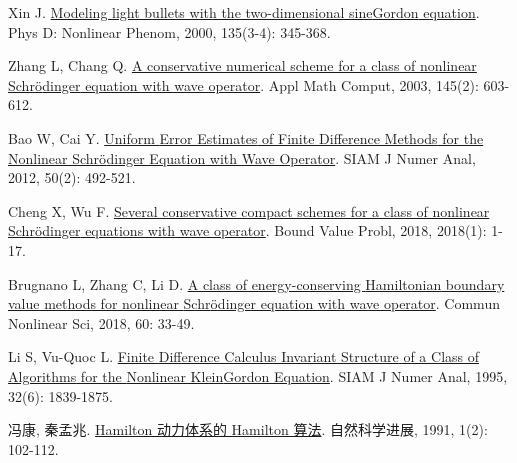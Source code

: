 \begin{thebibliography}{79}
    Xin J.
    \newblock \href{https://linkinghub.elsevier.com/retrieve/pii/S0167278999001281}{Modeling light bullets with the two-dimensional sine{\textendash}{{Gordon}} equation}\allowbreak[J].
    \newblock Phys D: Nonlinear Phenom, 2000, 135\allowbreak (3-4): 345-368.
    
    Zhang L, Chang Q.
    \newblock \href{https://www.sciencedirect.com/science/article/pii/S0096300302008421}{A conservative numerical scheme for a class of nonlinear {{Schr{\"o}dinger}} equation with wave operator}\allowbreak[J].
    \newblock Appl Math Comput, 2003, 145\allowbreak (2): 603-612.
    
    Bao W, Cai Y.
    \newblock \href{https://epubs.siam.org/doi/10.1137/110830800}{Uniform {{Error Estimates}} of {{Finite Difference Methods}} for the {{Nonlinear Schr{\"o}dinger Equation}} with {{Wave Operator}}}\allowbreak[J].
    \newblock SIAM J Numer Anal, 2012, 50\allowbreak (2): 492-521.
    
    Cheng X, Wu F.
    \newblock \href{https://boundaryvalueproblems.springeropen.com/articles/10.1186/s13661-018-0956-4}{Several conservative compact schemes for a class of nonlinear {{Schr{\"o}dinger}} equations with wave operator}\allowbreak[J].
    \newblock Bound Value Probl, 2018, 2018\allowbreak (1): 1-17.
    
    Brugnano L, Zhang C, Li D.
    \newblock \href{https://linkinghub.elsevier.com/retrieve/pii/S1007570417304409}{A class of energy-conserving {{Hamiltonian}} boundary value methods for nonlinear {{Schr{\"o}dinger}} equation with wave operator}\allowbreak[J].
    \newblock Commun Nonlinear Sci, 2018, 60: 33-49.
    
    Li S, {Vu-Quoc} L.
    \newblock \href{https://epubs.siam.org/doi/10.1137/0732083}{Finite {{Difference Calculus Invariant Structure}} of a {{Class}} of {{Algorithms}} for the {{Nonlinear Klein}}{\textendash}{{Gordon Equation}}}\allowbreak[J].
    \newblock SIAM J Numer Anal, 1995, 32\allowbreak (6): 1839-1875.
    
    冯康, 秦孟兆.
    \newblock \href{https://linkinghub.elsevier.com/retrieve/pii/S0096300318304983}{Hamilton 动力体系的 Hamilton 算法}\allowbreak[J].
    \newblock 自然科学进展, 1991, 1(2): 102-112.


\end{thebibliography}
